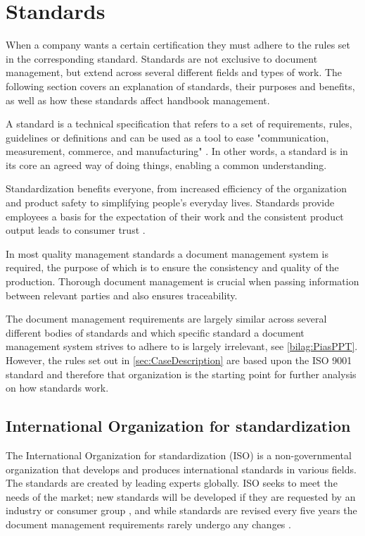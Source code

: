 \section{Standards} \label{sec:standards}
When a company wants a certain certification they must adhere to the rules set in the corresponding standard.
Standards are not exclusive to document management, but extend across several different fields and types of work.
The following section covers an explanation of standards, their purposes and benefits, as well as how these standards affect handbook management.

A standard is a technical specification that refers to a set of requirements, rules, guidelines or definitions \citep[p.~5]{Standard} and can be used as a tool to ease "communication, measurement, commerce, and manufacturing" \cite{Standardtool}.
In other words, a standard is in its core an agreed way of doing things, enabling a common understanding.

Standardization benefits everyone, from increased efficiency of the organization and product safety to simplifying people's everyday lives.
Standards provide employees a basis for the expectation of their work and the consistent product output leads to consumer trust \citep[p.~83]{Standardization}.

In most quality management standards a document management system is required, the purpose of which is to ensure the consistency and quality of the production.
Thorough document management is crucial when passing information between relevant parties and also ensures traceability.

The document management requirements are largely similar across several different bodies of standards and which specific standard a document management system strives to adhere to is largely irrelevant, see \cref{bilag:PiasPPT}.
However, the rules set out in \cref{sec:CaseDescription} are based upon the ISO 9001 standard and therefore that organization is the starting point for further analysis on how standards work.

\subsection{International Organization for standardization} \label{sec:ISOstandards}
The International Organization for standardization (ISO) is a non-governmental organization that develops and produces international standards in various fields.
The standards are created by leading experts globally. \cite{ISOinfo}
ISO seeks to meet the needs of the market; new standards will be developed if they are requested by an industry or consumer group \cite{ISOdeveloping}, and while standards are revised every five years the document management requirements rarely undergo any changes \cite{ISOreviewedevery5years}.

